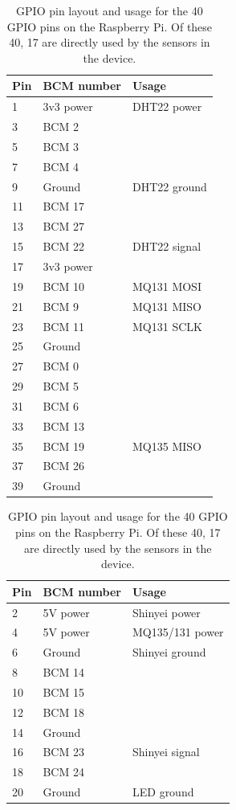 \documentclass[11pt]{report}
\begin{document}
\begin{table}[!tb]
  \centering
  \small
  \caption{GPIO pin layout and usage for the 40 GPIO pins on the Raspberry Pi. Of these 40, 17 are directly used by the sensors in the device.}
  \label{gpio}
  \begin{tabular}{ l l l }
  \toprule
  Pin & BCM number & Usage \\ \midrule
  1 & 3v3 power & DHT22 power  \\
  3 & BCM 2 &  \\
  5 & BCM 3 &  \\
  7 & BCM 4 &  \\
  9 & Ground & DHT22 ground  \\
  11 & BCM 17 &  \\
  13 & BCM 27 &  \\
  15 & BCM 22 & DHT22 signal  \\
  17 & 3v3 power &  \\
  19 & BCM 10 & MQ131 MOSI \\
  21 & BCM 9 & MQ131 MISO \\
  23 & BCM 11 & MQ131 SCLK \\
  25 & Ground &  \\
  27 & BCM 0 &  \\
  29 & BCM 5 &  \\
  31 & BCM 6 &  \\
  33 & BCM 13 &  \\
  35 & BCM 19 & MQ135 MISO \\
  37 & BCM 26 &  \\
  39 & Ground &  \\ \bottomrule
  \end{tabular}
  \hspace{0.5em}
  \begin{tabular}{ l l l }
  \toprule
  Pin & BCM number & Usage \\ \midrule
  2 & 5V power & Shinyei power \\
  4 & 5V power & MQ135/131 power \\
  6 & Ground & Shinyei ground  \\
  8 & BCM 14 &  \\
  10 & BCM 15 &  \\
  12 & BCM 18 &  \\
  14 & Ground &  \\
  16 & BCM 23 & Shinyei signal \\
  18 & BCM 24 & \\
  20 & Ground & LED ground \\

\end{tabular}
\end{table}
\end{document}
